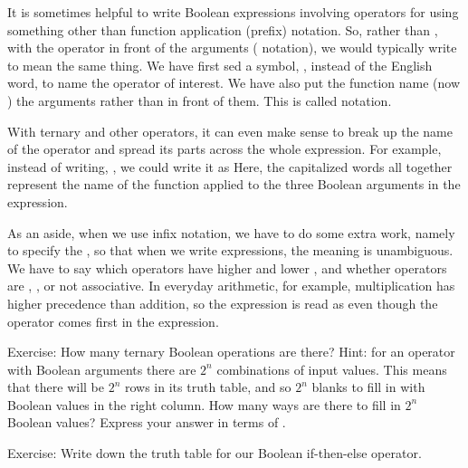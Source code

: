 \documentclass[letterpaper,10pt,english]{sphinxmanual}
\begin{document}
It is sometimes helpful to write Boolean expressions involving 
operators for  using something other than function application
(prefix) notation. So, rather than , with the
operator in front of the arguments ( notation), we would
typically write  to mean the same thing. We have first
sed a symbol, \sphinxstyleemphasis{\&\&}, instead of the English word,  to name the
operator of interest. We have also put the function name (now \sphinxstyleemphasis{\&\&})
 the arguments rather than in front of them. This is called
 notation.

With ternary and other operators, it can even make sense to break up
the name of the operator and spread its parts across the whole
expression. For example, instead of writing, , we could write it as 
Here, the capitalized words all together represent the name of the
function applied to the three Boolean arguments in the expression.

As an aside, when we use infix notation, we have to do some extra
work, namely to specify the , so that when we
write expressions, the meaning is unambiguous. We have to say which
operators have higher and lower , and whether operators
are , , or not associative. In everyday arithmetic, for
example, multiplication has higher precedence than addition, so the
expression  is read as  even though the \sphinxstyleemphasis{+}
operator comes first in the expression.

Exercise: How many ternary Boolean operations are there? Hint: for an
operator with  Boolean arguments there are \(2^n\) combinations
of input values. This means that there will be \(2^n\) rows in its
truth table, and so \(2^n\) blanks to fill in with Boolean values
in the right column. How many ways are there to fill in \(2^n\)
Boolean values? Express your answer in terms of .

Exercise: Write down the truth table for our Boolean if-then-else
operator.
\end{document}
